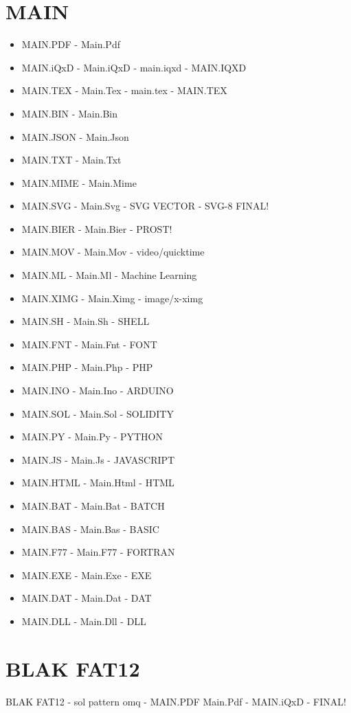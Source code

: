 \documentclass[12pt]{article}
\begin{document}
\section*{MAIN}
\begin{itemize}
\item MAIN.PDF - Main.Pdf
\item MAIN.iQxD - Main.iQxD - main.iqxd - MAIN.IQXD
\item MAIN.TEX - Main.Tex - main.tex - MAIN.TEX
\item MAIN.BIN - Main.Bin
\item MAIN.JSON - Main.Json
\item MAIN.TXT - Main.Txt
\item MAIN.MIME - Main.Mime
\item MAIN.SVG - Main.Svg - SVG VECTOR - SVG-8 FINAL!
\item MAIN.BIER - Main.Bier - PROST!
\item MAIN.MOV - Main.Mov - video/quicktime
\item MAIN.ML - Main.Ml - Machine Learning
\item MAIN.XIMG - Main.Ximg - image/x-ximg
\item MAIN.SH - Main.Sh - SHELL
\item MAIN.FNT - Main.Fnt - FONT
\item MAIN.PHP - Main.Php - PHP
\item MAIN.INO - Main.Ino - ARDUINO
\item MAIN.SOL - Main.Sol - SOLIDITY
\item MAIN.PY - Main.Py - PYTHON
\item MAIN.JS - Main.Js - JAVASCRIPT
\item MAIN.HTML - Main.Html - HTML
\item MAIN.BAT - Main.Bat - BATCH
\item MAIN.BAS - Main.Bas - BASIC
\item MAIN.F77 - Main.F77 - FORTRAN
\item MAIN.EXE - Main.Exe - EXE
\item MAIN.DAT - Main.Dat - DAT
\item MAIN.DLL - Main.Dll - DLL
\end{itemize}

\section*{BLAK FAT12}
BLAK FAT12 - sol pattern omq - MAIN.PDF Main.Pdf - MAIN.iQxD - FINAL!
\end{document}
